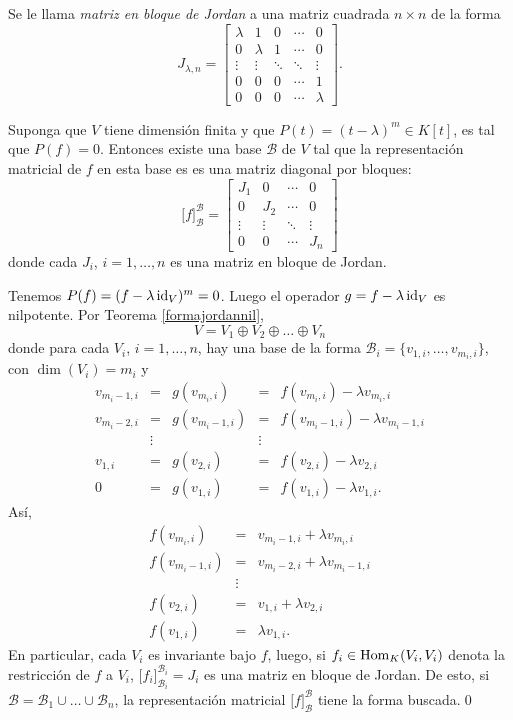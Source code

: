 \begin{defn}
Se le llama \emph{matriz en bloque de Jordan} a una matriz cuadrada $n\times n$ de la forma
\[
J_{\lambda,n}=\left[\begin{array}{ccccc}
\lambda & 1 & 0 &\cdots & 0\\
0 & \lambda & 1 &\cdots & 0\\
\vdots & \vdots & \ddots &\ddots & \vdots\\
0 & 0 & 0 & \cdots & 1\\
0 & 0 & 0 & \cdots & \lambda
\end{array}\right].
\]
\end{defn}

\begin{lema}
Suponga que $V$ tiene dimensi\'on finita y que $P(t)=(t-\lambda)^m\in K[t]$, es tal que $P(f)=0$. Entonces existe una base $\mathcal{B}$ de $V$ tal que la representaci\'on matricial de $f$ en esta base es
es una matriz diagonal por bloques:
\[
\Big[f\Big]^{\mathcal{B}}_{\mathcal{B}}=\left[\begin{array}{c|c|c|c}
J_1 & 0 & \cdots & 0\\
\hline
0 & J_2 & \cdots & 0\\
\hline
\vdots & \vdots & \ddots & \vdots\\
\hline
0 & 0 & \cdots & J_n
\end{array}\right] 
\]
donde cada $J_i$, $i=1,\ldots,n$ es una matriz en bloque de Jordan.
\end{lema}

\dem Tenemos $P(f)=(f-\lambda\operatorname{id}_V)^m=0$. Luego el operador $g=f-\lambda\operatorname{id}_V$ es nilpotente. Por Teorema \ref{formajordannil},
\[
V=V_1\oplus V_2\oplus\ldots\oplus V_n
\]
donde para cada $V_i$, $i=1,\ldots, n$, hay una base de la forma $\mathcal{B}_i=\{v_{1,i},\ldots,v_{m_i,i}\}$, con $\dim(V_i)=m_i$ y
\[
\begin{array}{rcccl}
v_{m_i-1,i} & = & g(v_{m_i,i}) & = & f(v_{m_i,i})-\lambda v_{m_i,i}\\
v_{m_i-2,i} & = & g(v_{m_i-1,i}) & = & f(v_{m_i-1,i})-\lambda v_{m_i-1,i}\\
 & \vdots & & \vdots & \\
v_{1,i} & = & g(v_{2,i}) & = & f(v_{2,i})-\lambda v_{2,i}\\
0 & = & g(v_{1,i}) & = & f(v_{1,i})-\lambda v_{1,i}.
\end{array}
\]
As\'i,
\begin{eqnarray*}
f(v_{m_i,i}) & = & v_{m_i-1,i}+\lambda v_{m_i,i}\\
f(v_{m_i-1,i}) & = & v_{m_i-2,i}+\lambda v_{m_i-1,i}\\
 & \vdots & \\
f(v_{2,i}) & = & v_{1,i}+\lambda v_{2,i}\\
f(v_{1,i}) & = & \lambda v_{1,i}.
\end{eqnarray*}
En particular, cada $V_i$ es invariante bajo $f$, luego, si $f_i\in\operatorname{Hom}_K(V_i,V_i)$ denota la restricci\'on de $f$ a $V_i$,
$\Big[f_i\Big]^{\mathcal{B}_i}_{\mathcal{B}_i}=J_i$ es una matriz en bloque de Jordan. De esto, si $\mathcal{B}=\mathcal{B}_1\cup\ldots\cup \mathcal{B}_n$, la representaci\'on matricial $\Big[f\Big]^{\mathcal{B}}_{\mathcal{B}}$ tiene la forma buscada.\qed

